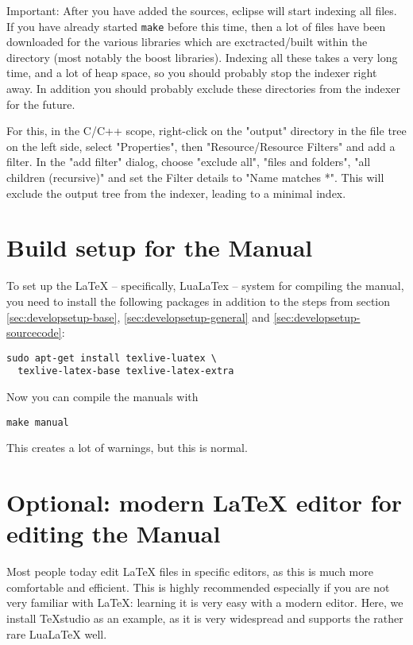 Important: After you have added the sources, eclipse will start indexing all files. If you have already started \texttt{make} before this time, then a lot of files have been downloaded for the various libraries which are exctracted/built within the \xc directory (most notably the boost libraries). Indexing all these takes a very long time, and a lot of heap space, so you should probably stop the indexer right away. In addition you should probably exclude these directories from the indexer for the future.

For this, in the C/C++ scope, right-click on the "output" directory in the file tree on the left side, select "Properties", then "Resource/Resource Filters" and add a filter. In the "add filter" dialog, choose "exclude all", "files and folders", "all children (recursive)" and set the Filter details to "Name matches *".
This will exclude the output tree from the indexer, leading to a minimal index.

\section{Build setup for the Manual}
To set up the LaTeX -- specifically, LuaLaTex -- system for compiling the manual, you need to install the following packages in addition to the steps from section \ref{sec:developsetup-base}, \ref{sec:developsetup-general} and \ref{sec:developsetup-sourcecode}:

\begin{verbatim}
sudo apt-get install texlive-luatex \
  texlive-latex-base texlive-latex-extra
\end{verbatim}

Now you can compile the manuals with 

\begin{verbatim}
make manual
\end{verbatim}

This creates a lot of warnings, but this is normal.

\section{Optional: modern LaTeX editor for editing the Manual}
Most people today edit LaTeX files in specific editors, as this is much more comfortable and efficient. This is highly recommended especially if you are not very familiar with LaTeX: learning it is very easy with a modern editor. Here, we install TeXstudio as an example, as it is very widespread and supports the rather rare LuaLaTeX well.

